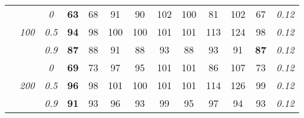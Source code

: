 \begin{table}
\begin{center}
\begin{tabular}{ccc|cc|cc|cc|cc|c|c}
\cline{2-3}\rule{0pt}{3ex}
& & \it  0  & {\bf 63} & 68 & 91 & 90 & 102 & 100 & 81 & 102 & 67 & \it  0.12 \\
 & \it  100  & \it  0.5  & {\bf 94} & 98 & 100 & 100 & 101 & 101 & 113 & 124 & 98 & \it  0.12 \\
& & \it  0.9  & {\bf 87} & 88 & 91 & 88 & 93 & 88 & 93 & 91 & {\bf 87} & \it  0.12 \\[1ex]
\cline{2-3}\rule{0pt}{3ex}
& & \it  0  & {\bf 69} & 73 & 97 & 95 & 101 & 101 & 86 & 107 & 73 & \it  0.12 \\
 & \it  200  & \it  0.5  & {\bf 96} & 98 & 101 & 100 & 101 & 101 & 114 & 126 & 99 & \it  0.12 \\
& & \it  0.9  & {\bf 91} & 93 & 96 & 93 & 99 & 95 & 97 & 94 & 93 & \it  0.12 \\
\hline\end{tabular}
\end{center}
\end{table}




